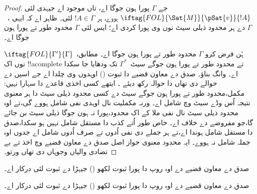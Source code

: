 \documentclass[../../../include/open-logic-section]{subfiles}
\begin{document}
\begin{proof}
جے $\Gamma$ پورا ہون جوگا اے، تاں
موجود اے جیہدی لئی
$\iftag{FOL}{\Sat{M}}{\pSat{v}}{!A}$
ہووے، ہر $!A \in \Gamma$ لئی۔
ظاہر اے کہ ایہی
،~$\Gamma$ دے ہر محدود ذیلی سیٹ
نوں وی پورا کردی اے؛ ایس لئی
$\Gamma$ محدود طور تے پورا ہون جوگا اے۔

ہُن فرض کرو $\Gamma$ محدود طور تے پورا
ہون جوگا اے۔
 مطابق،
$\iftag{FOL}{\Gamma'}{\Gamma}$
نوں اک !!a{complete} تے محدود طور تے
پورا ہون جوگے سیٹ~$\Gamma^*$ تک ودھایا
جا سکدا اے۔
 وانگ
بناؤ۔
صدق دے معاون قضیے دا ثبوت ()
اوہدوں وی چلدا اے جے اسیں
 دے حوالے دی تھاں
 دا حوالہ رکھ دیئے
۔
ایتھے کسی اخذی قاعدے دا سہارا نہیں: مکمل،محدود طور تے پورا ہون
جوگے سیٹ دے کسی محدود ذیلی سیٹ دا ہر معنوی نتیجہ اُس وڈے سیٹ
وچ شامل اے۔ ورنہ مکملیت نال اوہدی نفی شامل ہووے گی،تے اوہ
محدود ذیلی سیٹ نال نفی ملا کے اک محدود،پورا نہ ہون جوگا ذیلی
سیٹ بن جائے گا،جو مفروضے دے خلاف اے۔ خاص طور اُتے کذب دا
مستقل شامل نہیں ہو سکدا،صدق دا مستقل شامل ہوندا اے،تے ہر
جملے دی نفی اُدوں تے صرف اُدوں شامل اے جدوں اوہ جملہ شامل
نہ ہووے۔ ایہ محدود معنوی جواز اصل صدق دے معاون قضیے وچ اخذ تے بے تضادی
والیاں وجوہاں دی تھاں ورتو۔
\end{proof}

\begin{prob}
صدق دے معاون قضیے دے اوہ روپ دا پورا ثبوت
لکھو ()
جیہڑا 
دے ثبوت لئی درکار اے۔
\end{prob}
\tagendprob

\begin{prob}
صدق دے معاون قضیے دے اوہ روپ دا پورا ثبوت
لکھو ()
جیہڑا 
دے ثبوت لئی درکار اے۔
\end{prob}
\tagendprob
\end{document}
